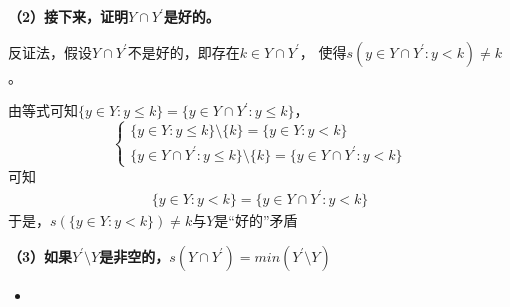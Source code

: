 \documentclass{article}
\begin{document}
\textbf{（2）接下来，证明$Y \cap Y^\prime$是好的。}

反证法，假设$Y \cap Y^\prime$不是好的，即存在$k \in Y \cap Y^\prime$，
使得$s({y \in Y \cap Y^\prime : y < k }) \neq k$。

由等式可知$\{y \in Y : y \leq k \} = \{y \in Y \cap Y^\prime : y \leq k \}$，
\begin{equation*}
  \begin{cases*}
    \{y \in Y : y \leq k \} \setminus \{k\}                = \{y \in Y : y < k \} \\
    \{y \in Y \cap Y^\prime : y \leq k \} \setminus \{k\}  = \{y \in Y \cap Y^\prime : y < k \}
  \end{cases*}
\end{equation*}
可知
\begin{align*}
  \{y \in Y : y < k \} = \{y \in Y \cap Y^\prime : y < k \}
\end{align*}
于是，$s(\{y \in Y : y < k \}) \neq k$与$Y$是“好的”矛盾

\textbf{（3）如果$Y^\prime \setminus Y$是非空的，$s(Y \cap Y^\prime) = min(Y^\prime \setminus Y )$}

\begin{itemize}
  \item 
\end{itemize}
\end{document}
